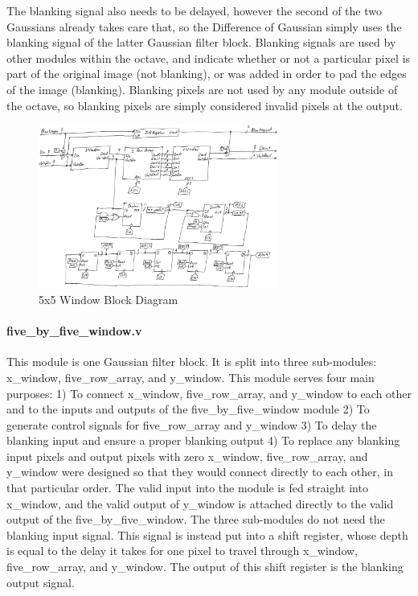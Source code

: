 \documentclass[12pt]{article}
\begin{document}
The blanking signal also needs to be delayed, however the second of the two 
Gaussians already takes care that, so the Difference of Gaussian simply uses the 
blanking signal of the latter Gaussian filter block. Blanking signals are used 
by other modules within the octave, and indicate whether or not a particular 
pixel is part of the original image (not blanking), or was added in order to pad 
the edges of the image (blanking). Blanking pixels are not used by any module 
outside of the octave, so blanking pixels are simply considered invalid pixels 
at the output.


\begin{figure}
    \centering
    \includegraphics[width=0.7\textwidth]{processed_image_pngs/5x5_block.png}
    \caption{5x5 Window Block Diagram}
    \label{fig:five_window}
\end{figure}

\paragraph{five\_by\_five\_window.v}

This module is one Gaussian filter block. It is split into three sub-modules: 
x\_window, five\_row\_array, and y\_window. This module serves four main purposes:
1) To connect x\_window, five\_row\_array, and y\_window to each other and to the 
   inputs and outputs of the five\_by\_five\_window module
2) To generate control signals for five\_row\_array and y\_window
3) To delay the blanking input and ensure a proper blanking output
4) To replace any blanking input pixels and output pixels with zero
x\_window, five\_row\_array, and y\_window were designed so that they would connect 
directly to each other, in that particular order. The valid input into the 
module is fed straight into x\_window, and the valid output of y\_window is 
attached directly to the valid output of the five\_by\_five\_window.
The three sub-modules do not need the blanking input signal. This signal is 
instead put into a shift register, whose depth is equal to the delay it takes 
for one pixel to travel through x\_window, five\_row\_array, and y\_window. The 
output of this shift register is the blanking output signal.
\end{document}
